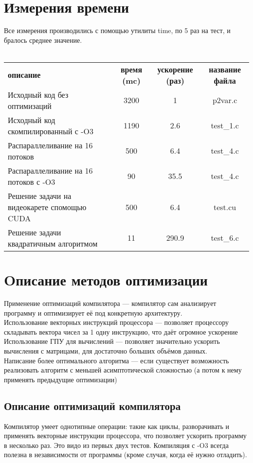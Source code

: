 \documentclass[a4peper, 12pt, titlepage, finall]{extreport}
\begin{document}
    \newpage
    \section{Измерения времени}
        Все измерения производились с помощью утилиты {\ttfamily time}, по 5 раз на тест, и бралось среднее значение.\\ \\
            \begin{tabular}{lccc}
                \bf описание & \bf время (mc) & \bf ускорение (раз) &\bf название файла \\
                Исходный код без оптимизаций & 3200 & 1 &p2var.c \\
                Исходный код скомпилированный с {\ttfamily -O3} & 1190 & 2.6 & test\_1.c \\
                Распараллеливание на 16 потоков & 500 & 6.4 & test\_4.c \\
                Распараллеливание на 16 потоков с {\ttfamily -O3} & 90 & 35.5 & test\_4.c \\
                Решение задачи на видеокарете спомощью {\ttfamily CUDA} & 500 & 6.4 & test.cu \\
                Решение задачи квадратичным алгоритмом & 11 & 290.9 & test\_6.c \\
            \end{tabular}
       
    \section{Oписание методов оптимизации}
        Применение оптимизаций компилятора — компилятор сам анализирует программу и
        оптимизирует её под конкретную архитектуру. \\
        Использование векторных инструкций процессора — позволяет процессору складывать
        вектора чисел за 1 одну инструкцию, что даёт огромное ускорение\\
        Использование ГПУ для вычислений — позволяет значительно ускорить вычисления с
        матрицами, для достаточно больших объёмов данных.\\
        Написание более оптимального алгоритма — если существует возможность реализовать
        алгоритм с меньшей асимптотической сложностью (а потом к нему применять предыдущие
        оптимизации) \\

        \subsection{Описание оптимизаций компилятора}
            Компилятор умеет однотипные операции: такие как циклы, разворачивать и применять векторные инструкции процессора, 
            что позволяет ускорить программу в несколько раз. Это видо из первых двух тестов. 
            Компиляция с {\ttfamily -O3} всегда полезна в независимости от программы (кроме случая, когда её нужно отладить). 
\end{document}
